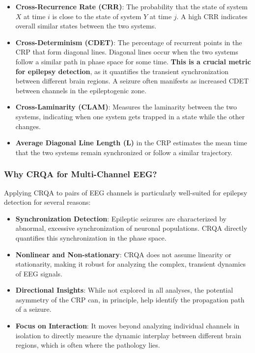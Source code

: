 \documentclass{article}
\begin{document}
					\begin{itemize}
					    \item \textbf{Cross-Recurrence Rate (CRR)}: The probability that the state of system \( X \) at time \( i \) is close to the state of system \( Y \) at time \( j \). A high CRR indicates overall similar states between the two systems.
					    
					    \item \textbf{Cross-Determinism (CDET)}: The percentage of recurrent points in the CRP that form diagonal lines. Diagonal lines occur when the two systems follow a similar path in phase space for some time. \textbf{This is a crucial metric for epilepsy detection}, as it quantifies the transient synchronization between different brain regions. A seizure often manifests as increased CDET between channels in the epileptogenic zone.
					    
					    \item \textbf{Cross-Laminarity (CLAM)}: Measures the laminarity between the two systems, indicating when one system gets trapped in a state while the other changes.
					    
					    \item \textbf{Average Diagonal Line Length (L)} in the CRP estimates the mean time that the two systems remain synchronized or follow a similar trajectory.
					\end{itemize}

					\subsubsection{Why CRQA for Multi-Channel EEG?}

					Applying CRQA to pairs of EEG channels is particularly well-suited for epilepsy detection for several reasons:

					\begin{itemize}
					    \item \textbf{Synchronization Detection}: Epileptic seizures are characterized by abnormal, excessive synchronization of neuronal populations. CRQA directly quantifies this synchronization in the phase space.
					    \item \textbf{Nonlinear and Non-stationary}: CRQA does not assume linearity or stationarity, making it robust for analyzing the complex, transient dynamics of EEG signals.
					    \item \textbf{Directional Insights}: While not explored in all analyses, the potential asymmetry of the CRP can, in principle, help identify the propagation path of a seizure.
					    \item \textbf{Focus on Interaction}: It moves beyond analyzing individual channels in isolation to directly measure the dynamic interplay between different brain regions, which is often where the pathology lies.
					\end{itemize}
\end{document}
